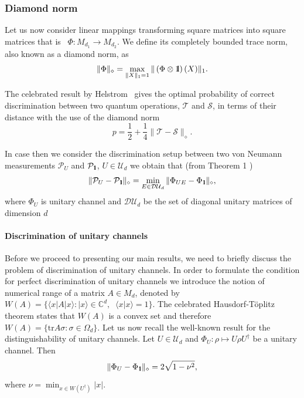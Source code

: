 \documentclass[preprint,12pt, a4paper]{elsarticle}
\newcommand{\ket}[1]{\ensuremath{|#1\rangle}}
\newcommand{\bra}[1]{\ensuremath{\langle#1|}}
\newcommand{\braket}[2]{\ensuremath{\langle{#1}|{#2}\rangle}}
\newcommand{\1}{{\rm 1\hspace{-0.9mm}l}}
\newcommand{\Id}{{\rm 1\hspace{-0.9mm}l}}
\newcommand{\TT}{\mathcal{T}}
\newcommand{\PP}{\mathcal{P}}
\renewcommand{\SS}{\mathcal{S}}
\newcommand{\UU}{\mathcal{U}}
\newcommand{\diaguni}{\ensuremath{\mathcal{DU}}}
\newcommand{\tr}{\mathrm{tr}}
\begin{document}
\subsubsection{Diamond norm}
Let us now consider linear mappings transforming  square matrices into square 
matrices 
that is \ $\Phi: M_{d_1} \to M_{d_2}$. 
 We define its completely bounded trace
norm, also known as a diamond norm, as
\begin{equation}
\|\Phi\|_\diamond = \max_{\|X\|_1=1} \| \left(\Phi \otimes \1\right) (X) \|_1.
\end{equation}


The celebrated result by Helstrom~\cite{helstrom1976quantum} gives the optimal  probability of correct discrimination between two quantum operations, $\TT$  and $\SS$, 
in terms of their distance with the use of the diamond norm
\begin{equation}
p =  \frac12 + \frac14 \| \TT - \SS \|_\diamond.
\end{equation}

In case then 
we consider the discrimination setup between two von Neumann 
measurements $\PP_U$ and $\PP_\Id$, $U\in \UU_d$ we obtain that (from Theorem 1 \cite{puchala2018strategies})
\begin{equation}
\|\PP_U - \PP_\Id\|_\diamond = \min_{E \in \diaguni_d} \|\Phi_{UE} - 
\Phi_\Id\|_\diamond,
\end{equation}
where $\Phi_U$ is unitary channel and 
$\diaguni_d$ be the set of diagonal unitary matrices of dimension $d$



\paragraph{Discrimination of unitary channels}

Before we proceed to presenting our main results, we need to briefly discuss the
problem of discrimination of unitary channels.  In order to formulate the condition for perfect
discrimination of unitary channels we introduce the notion of numerical range of
a matrix $A \in M_d$, denoted by $W(A) =\{\bra{x}A\ket{x}: \ket{x} \in 
\mathbb{C}^d, \;
\;\braket{x}{x}=1\}$. The celebrated Hausdorf-T\"oplitz
theorem states that
$W(A)$ is a convex set and therefore $W(A) =\{\tr A \sigma : \sigma \in \Omega_d
\}$. Let us now recall the well-known result for the
distinguishability of unitary channels.
	Let $U \in \UU_d$ and $\Phi_U: \rho \mapsto U \rho U^\dagger$ be a unitary 
	channel. 
	Then 
	\begin{equation}
	\| \Phi_U  - \Phi_{\1} \|_\diamond = 2 \sqrt{1-\nu^2},
	\end{equation}
	where $\nu = \min_{x \in W(U^\dagger)} |x|  $. 
\end{document}
